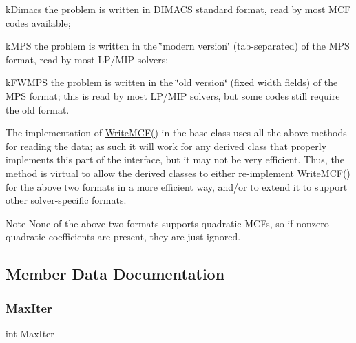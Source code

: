 \begin{DoxyItemize}
\item k\+Dimacs the problem is written in D\+I\+M\+A\+CS standard format, read by most M\+CF codes available;
\item k\+M\+PS the problem is written in the \char`\"{}modern version\char`\"{} (tab-\/separated) of the M\+PS format, read by most L\+P/\+M\+IP solvers;
\begin{DoxyItemize}
\item k\+F\+W\+M\+PS the problem is written in the \char`\"{}old version\char`\"{} (fixed width fields) of the M\+PS format; this is read by most L\+P/\+M\+IP solvers, but some codes still require the old format.
\end{DoxyItemize}
\end{DoxyItemize}

The implementation of \mbox{\hyperlink{class_m_c_f_class_acd008d9548bf3e1aef1291864171bb2d}{Write\+M\+C\+F()}} in the base class uses all the above methods for reading the data; as such it will work for any derived class that properly implements this part of the interface, but it may not be very efficient. Thus, the method is virtual to allow the derived classes to either re-\/implement \mbox{\hyperlink{class_m_c_f_class_acd008d9548bf3e1aef1291864171bb2d}{Write\+M\+C\+F()}} for the above two formats in a more efficient way, and/or to extend it to support other solver-\/specific formats.

\begin{DoxyNote}{Note}
None of the above two formats supports quadratic M\+C\+Fs, so if nonzero quadratic coefficients are present, they are just ignored. 
\end{DoxyNote}


\subsection{Member Data Documentation}
\mbox{\label{class_m_c_f_class_a259eaddd4d91ec0a7d00ff6db0a3f40a}} 
\subsubsection{\texorpdfstring{Max\+Iter}{MaxIter}}
{\footnotesize\ttfamily int Max\+Iter\hspace{0.3cm}{\ttfamily [protected]}}


